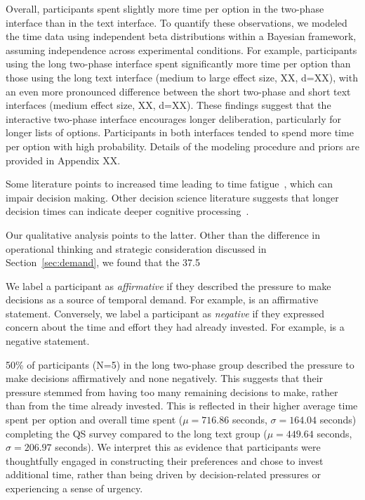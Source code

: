 Overall, participants spent slightly more time per option in the two-phase interface than in the text interface. To quantify these observations, we modeled the time data using independent beta distributions within a Bayesian framework, assuming independence across experimental conditions. For example, participants using the long two-phase interface spent significantly more time per option than those using the long text interface (medium to large effect size, XX, d=XX), with an even more pronounced difference between the short two-phase and short text interfaces (medium effect size, XX, d=XX). These findings suggest that the interactive two-phase interface encourages longer deliberation, particularly for longer lists of options. Participants in both interfaces tended to spend more time per option with high probability. Details of the modeling procedure and priors are provided in Appendix XX.

Some literature points to increased time leading to time fatigue~\cite{}, which can impair decision making. Other decision science literature suggests that longer decision times can indicate deeper cognitive processing~\cite{payneAdaptiveDecisionMaker1993}.

Our qualitative analysis points to the latter.
Other than the difference in operational thinking and strategic consideration discussed in Section~\ref{sec:demand}, we found that the 37.5%

We label a participant as \textit{affirmative} if they described the pressure to make decisions as a source of temporal demand. For example,  is an affirmative statement. Conversely, we label a participant as \textit{negative} if they expressed concern about the time and effort they had already invested. For example,  is a negative statement.

50\% of participants (N=5) in the long two-phase group described the pressure to make decisions affirmatively and none negatively. This suggests that their pressure stemmed from having too many remaining decisions to make, rather than from the time already invested. This is reflected in their higher average time spent per option and overall time spent ($\mu=716.86$ seconds, $\sigma=164.04$ seconds) completing the QS survey compared to the long text group ($\mu=449.64$ seconds, $\sigma=206.97$ seconds). We interpret this as evidence that participants were thoughtfully engaged in constructing their preferences and chose to invest additional time, rather than being driven by decision-related pressures or experiencing a sense of urgency.

